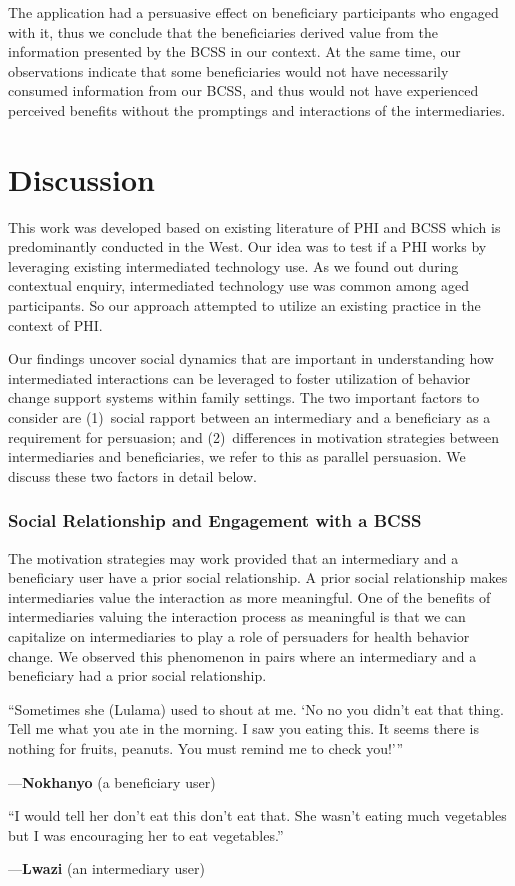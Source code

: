\documentclass{sig-alternate}
\newenvironment{myquote}
               {\list{}{\rightmargin   \leftmargin
                        \parsep        0in }%
                \item\relax}
               {\endlist}
\newcommand{\userquote}[2]{\begin{samepage}\begin{myquote} 
     \em{\small{#2\begin{flushright}---#1\end{flushright}}}
   \end{myquote}\end{samepage}}
\begin{document}
The application had a persuasive effect on beneficiary participants who
engaged with it, thus we conclude that the beneficiaries derived
value from the information presented by the BCSS in our context. 
At the same time, our observations indicate that 
some beneficiaries would not have necessarily consumed information from
our BCSS, and thus would not have experienced perceived benefits 
without the promptings and interactions of the intermediaries.
 

\section{Discussion}

This work was developed based on existing literature of PHI and BCSS which is
predominantly conducted in the West.
Our idea was to test if a PHI works by
leveraging existing intermediated technology use. As we found out during
contextual enquiry, intermediated technology use was common among aged
participants. So our approach attempted to utilize an existing practice
in the context of PHI.

Our findings uncover social dynamics that are important in understanding how
intermediated interactions can be leveraged to foster utilization of behavior
change support systems within family settings. The two important factors to
consider are (1)~social rapport between an intermediary and a beneficiary as a
requirement for persuasion; and (2)~differences in motivation strategies
between intermediaries and beneficiaries, we refer to this as parallel
persuasion.  We discuss these two factors in detail below.

\subsubsection*{\textbf{Social Relationship and Engagement with a BCSS}}

The motivation strategies may work provided that an intermediary and a
beneficiary user have a prior social relationship. A prior social relationship
makes intermediaries value the interaction as more meaningful. One of the
benefits of intermediaries valuing the interaction process as meaningful is
that we can capitalize on intermediaries to play a role of persuaders for
health behavior change. We observed this phenomenon in pairs where an
intermediary and a beneficiary had a prior social relationship.

\userquote{\textbf{Nokhanyo} (a beneficiary user)}
 {``Sometimes she (Lulama) 
used to shout at me. `No no you didn't eat that thing. Tell me what you 
ate in the morning. I saw you eating this. It seems there is nothing for 
fruits, peanuts. You must remind me to check you!'''}
\userquote{\textbf{Lwazi} (an intermediary user)}
{``I would tell her don't eat this don't eat that. She wasn't 
eating much vegetables but I was encouraging her to eat vegetables.''}
\end{document}
